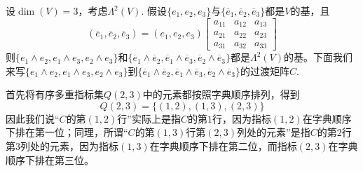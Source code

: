 \begin{example}[]
设$\operatorname{dim}(V)=3$，考虑$\Lambda^{2}(V)$. 假设$\{e_{1},e_{2},e_{3} \}$与$\{\overline{e}_{1},\overline{e}_{2},\overline{e}_{3}\}$都是$V$的基，且
\[
\left( \overline{e}_{1},\overline{e}_{2},\overline{e}_{3} \right)=\left( e_{1},e_{2},e_{3} \right)\left[\begin{array}{ccc}
	a_{11} & a_{12} & a_{13} \\
	a_{21} & a_{22} & a_{23} \\
	a_{31} & a_{32} & a_{33} 
	\end{array}\right]
\]
则$\{e_{1}\wedge e_{2},e_{1}\wedge e_{3},e_{2}\wedge e_{3}\}$和$\{\overline{e}_{1}\wedge \overline{e}_{2},\overline{e}_{1}\wedge \overline{e}_{3},\overline{e}_{2}\wedge \overline{e}_{3}\}$都是$\Lambda^{2}(V)$的基。下面我们来写$\{e_{1}\wedge e_{2},e_{1}\wedge e_{3},e_{2}\wedge e_{3}\}$到$\{\overline{e}_{1}\wedge \overline{e}_{2},\overline{e}_{1}\wedge \overline{e}_{3},\overline{e}_{2}\wedge \overline{e}_{3}\}$的过渡矩阵$C$.
\soln

首先将有序多重指标集$Q(2,3)$中的元素都按照字典顺序排列，得到
\[
	Q(2,3)=\{(1,2),(1,3),(2,3) \}
\]
因此我们说“$C$的第$(1,2)$行”实际上是指$C$的第$1$行，因为指标$(1,2)$在字典顺序下排在第一位；同理，所谓“$C$的第$(1,3)$行第$(2,3)$列处的元素”是指$C$的第$2$行第$3$列处的元素，因为指标$(1,3)$在字典顺序下排在第二位，而指标$(2,3)$在字典顺序下排在第三位。


\end{example}
